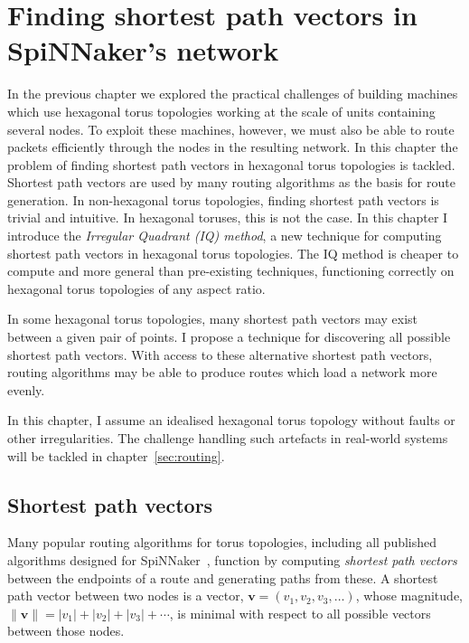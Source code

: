 \chapter{Finding shortest path vectors in SpiNNaker's network}
	
	\label{sec:shortestPaths}
	
	
	In the previous chapter we explored the practical challenges of building
	machines which use hexagonal torus topologies working at the scale of units
	containing several nodes. To exploit these machines, however, we must also be
	able to route packets efficiently through the nodes in the resulting network.
	In this chapter the problem of finding shortest path vectors in hexagonal
	torus topologies is tackled. Shortest path vectors are used by many routing
	algorithms as the basis for route generation. In non-hexagonal torus
	topologies, finding shortest path vectors is trivial and intuitive. In
	hexagonal toruses, this is not the case.  In this chapter I introduce the
	\emph{Irregular Quadrant (IQ) method}, a new technique for computing shortest
	path vectors in hexagonal torus topologies.  The IQ method is cheaper to
	compute and more general than pre-existing techniques, functioning correctly
	on hexagonal torus topologies of any aspect ratio.
	
	In some hexagonal torus topologies, many shortest path vectors may exist
	between a given pair of points. I propose a technique for discovering all
	possible shortest path vectors. With access to these alternative shortest
	path vectors, routing algorithms may be able to produce routes which load a
	network more evenly.
	
	In this chapter, I assume an idealised hexagonal torus topology without
	faults or other irregularities. The challenge handling such artefacts in
	real-world systems will be tackled in chapter~\ref{sec:routing}.
	
	\section{Shortest path vectors}
		
		Many popular routing algorithms for torus topologies, including all
		published algorithms designed for SpiNNaker~\cite{davies12,navaridas14},
		function by computing \emph{shortest path vectors} between the endpoints of
		a route and generating paths from these. A shortest path vector between two
		nodes is a vector, $\mathbf{v} = (v_1, v_2, v_3, \ldots)$, whose magnitude,
		$\| \mathbf{v} \| = \lvert v_1 \rvert + \lvert v_2 \rvert + \lvert v_3
		\rvert + \cdots$, is minimal with respect to all possible vectors between
		those nodes.
		
